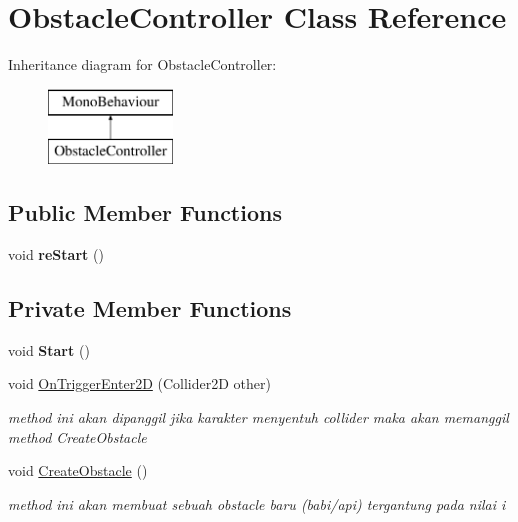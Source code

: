 \hypertarget{class_obstacle_controller}{}\section{Obstacle\+Controller Class Reference}
\label{class_obstacle_controller}
Inheritance diagram for Obstacle\+Controller\+:\begin{figure}[H]
\begin{center}
\leavevmode
\includegraphics[height=2.000000cm]{class_obstacle_controller}
\end{center}
\end{figure}
\subsection*{Public Member Functions}
\begin{DoxyCompactItemize}
\item 
\hypertarget{class_obstacle_controller_a4c3be71b2f4cc9228123fbe62cf090de}{}\label{class_obstacle_controller_a4c3be71b2f4cc9228123fbe62cf090de} 
void {\bfseries re\+Start} ()
\end{DoxyCompactItemize}
\subsection*{Private Member Functions}
\begin{DoxyCompactItemize}
\item 
\hypertarget{class_obstacle_controller_a5bc9c314bdf442520b7d8499f8b57849}{}\label{class_obstacle_controller_a5bc9c314bdf442520b7d8499f8b57849} 
void {\bfseries Start} ()
\item 
void \hyperlink{class_obstacle_controller_a2d1939f5e5a56507a9b0cdcfe70b38f9}{On\+Trigger\+Enter2D} (Collider2D other)
\begin{DoxyCompactList}\small\item\em method ini akan dipanggil jika karakter menyentuh collider maka akan memanggil method Create\+Obstacle \end{DoxyCompactList}\item 
void \hyperlink{class_obstacle_controller_ac4ade82f15fed22429690b7f20aee930}{Create\+Obstacle} ()
\begin{DoxyCompactList}\small\item\em method ini akan membuat sebuah obstacle baru (babi/api) tergantung pada nilai i \end{DoxyCompactList}\end{DoxyCompactItemize}
